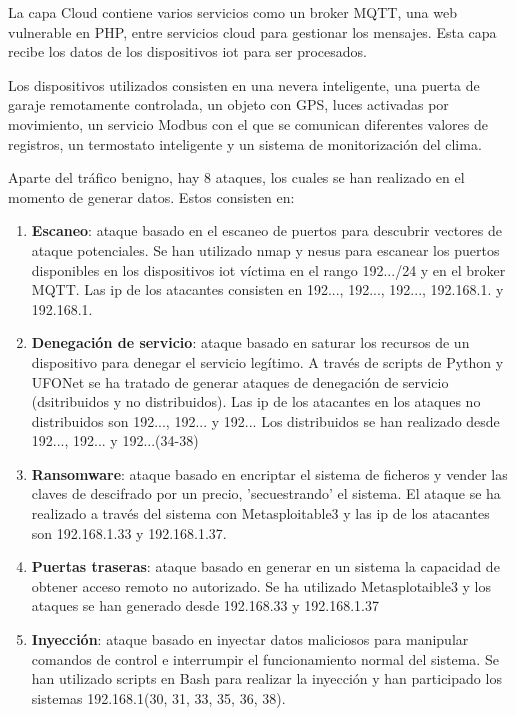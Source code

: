 La capa Cloud contiene varios servicios como un broker MQTT, una web vulnerable en PHP, entre servicios cloud para gestionar los mensajes. Esta capa recibe los datos de los dispositivos \acrshort{iot} para ser procesados.

Los dispositivos  utilizados consisten en una nevera inteligente, una puerta de garaje remotamente controlada, un objeto con GPS, luces activadas por movimiento, un servicio Modbus con el que se comunican diferentes valores de registros, un termostato inteligente y un sistema de monitorización del clima.

Aparte del tráfico benigno, hay 8 ataques, los cuales se han realizado en el momento de generar datos. Estos consisten en:
\begin{enumerate}
  \item \textbf{Escaneo}: ataque basado en el escaneo de puertos para descubrir vectores de ataque potenciales. Se han utilizado nmap y nesus para escanear los puertos disponibles en los dispositivos \acrshort{iot} víctima en el rango 192.../24 y en el broker MQTT. Las \acrshort{ip} de los atacantes consisten en 192..., 192..., 192..., 192.168.1. y 192.168.1.
  \item \textbf{Denegación de servicio}: ataque basado en saturar los recursos de un dispositivo para denegar el servicio legítimo. A través de scripts de Python y UFONet se ha tratado de generar ataques de denegación de servicio (dsitribuidos y no distribuidos). Las \acrshort{ip} de los atacantes en los ataques no distribuidos son 192..., 192... y 192... Los distribuidos se han realizado desde 192..., 192... y 192...\-(34-38)
  \item \textbf{Ransomware}: ataque basado en encriptar el sistema de ficheros y vender las claves de descifrado por un precio, 'secuestrando' el sistema. El ataque se ha realizado a través del sistema con Metasploitable3 y las \acrshort{ip} de los atacantes son 192.168.1.33 y 192.168.1.37.
  \item \textbf{Puertas traseras}: ataque basado en generar en un sistema la capacidad de obtener acceso remoto no autorizado. Se ha utilizado Metasplotaible3 y los ataques se han generado desde 192.168.33 y 192.168.1.37
  \item \textbf{Inyección}: ataque basado en inyectar datos maliciosos para manipular comandos de control e interrumpir el funcionamiento normal del sistema. Se han utilizado scripts en Bash para realizar la inyección y han participado los sistemas 192.168.1(30, 31, 33, 35, 36, 38).

\end{enumerate}

